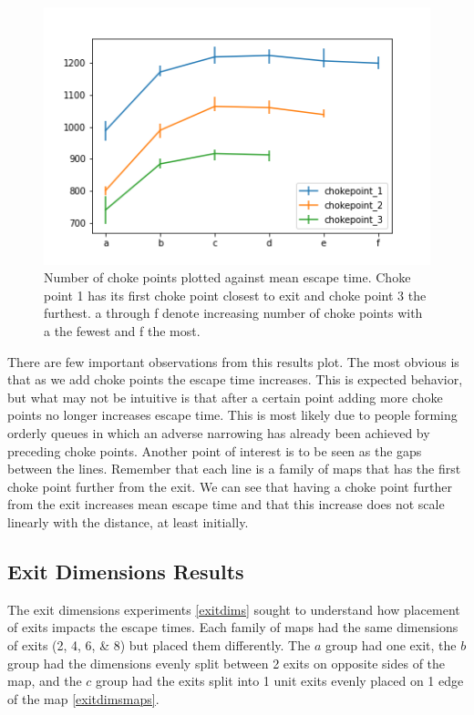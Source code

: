 \documentclass[12pt,letterpaper]{article}
\begin{document}
\begin{figure} [!ht]
  \centering
  \includegraphics[width=.9\linewidth]{./figures/chokepoint_graph.png}
  \caption{Number of choke points plotted against mean escape time. Choke point 1 has its first choke point closest to exit and choke point 3 the furthest.  a through f denote increasing number of choke points with a the fewest and f the most.}
  \label{fig:chokepointResults}
\end{figure}

There are few important observations from this results plot.  The most obvious is that as we add choke points the escape time increases.  This is expected behavior, but what may not be intuitive is that after a certain point adding more choke points no longer increases escape time.  This is most likely due to people forming orderly queues in which an adverse narrowing has already been achieved by preceding choke points. Another point of interest is to be seen as the gaps between the lines.  Remember that each line is a family of maps that has the first choke point further from the exit.  We can see that having a choke point further from the exit increases mean escape time and that this increase does not scale linearly with the distance, at least initially.  

\subsection{Exit Dimensions Results}

The exit dimensions experiments \ref{exitdims} sought to understand how placement of exits impacts the escape times.  Each family of maps had the same dimensions of exits (2, 4, 6, \& 8) but placed them differently.  The $a$ group had one exit, the $b$ group had the dimensions evenly split between 2 exits on opposite sides of the map, and the $c$ group had the exits split into 1 unit exits evenly placed on 1 edge of the map \ref{exitdimsmaps}.
\end{document}
